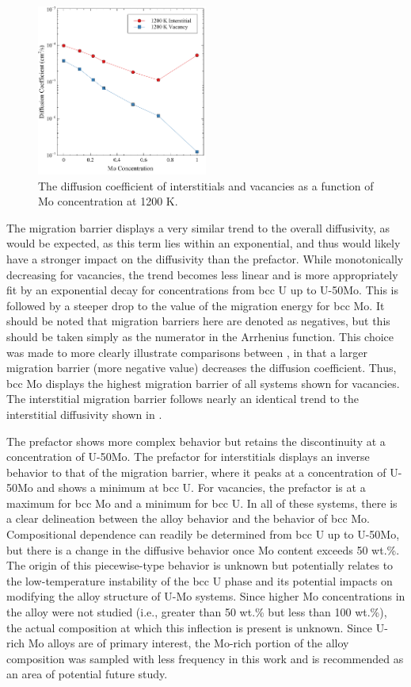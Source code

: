 \documentclass[review]{elsarticle}
\begin{document}
\begin{figure}[h]
    \centering
    \includegraphics[width=0.5\textwidth]{1200K_diff.pdf}
    \caption{The diffusion coefficient of interstitials and vacancies as a function of Mo concentration at 1200 K.}
    \label{fig:1200K_diff}
\end{figure}

The migration barrier displays a very similar trend to the overall diffusivity, as would be expected, as this term lies within an exponential, and thus would likely have a stronger impact on the diffusivity than the prefactor. While monotonically decreasing for vacancies, the trend becomes less linear and is more appropriately fit by an exponential decay for concentrations from bcc U up to U-50Mo. This is followed by a steeper drop to the value of the migration energy for bcc Mo. It should be noted that migration barriers here are denoted as negatives, but this should be taken simply as the numerator in the Arrhenius function. This choice was made to more clearly illustrate comparisons between , in that a larger migration barrier (more negative value) decreases the diffusion coefficient. Thus, bcc Mo displays the highest migration barrier of all systems shown for vacancies. The interstitial migration barrier follows nearly an identical trend to the interstitial diffusivity shown in . 

The prefactor shows more complex behavior but retains the discontinuity at a concentration of U-50Mo. The prefactor for interstitials displays an inverse behavior to that of the migration barrier, where it peaks at a concentration of U-50Mo and shows a minimum at bcc U. For vacancies, the prefactor is at a maximum for bcc Mo and a minimum for bcc U. In all of these systems, there is a clear delineation between the alloy behavior and the behavior of bcc Mo. Compositional dependence can readily be determined from bcc U up to U-50Mo, but there is a change in the diffusive behavior once Mo content exceeds 50 wt.\%. The origin of this piecewise-type behavior is unknown but potentially relates to the low-temperature instability of the bcc U phase and its potential impacts on modifying the alloy structure of U-Mo systems. Since higher Mo concentrations in the alloy were not studied (i.e., greater than 50 wt.\% but less than 100 wt.\%), the actual composition at which this inflection is present is unknown. Since U-rich Mo alloys are of primary interest, the Mo-rich portion of the alloy composition was sampled with less frequency in this work and is recommended as an area of potential future study. 
\end{document}
